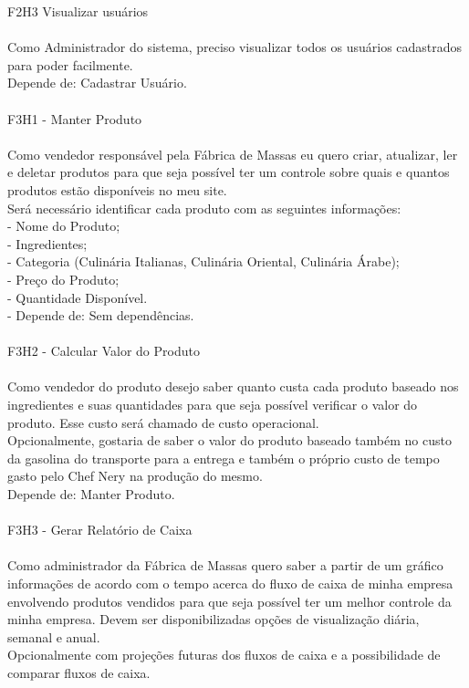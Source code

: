 \tab F2H3 Visualizar usuários\\
\\
\tab Como Administrador do sistema, preciso visualizar todos os usuários cadastrados para poder facilmente.\\
\tab Depende de: Cadastrar Usuário.\\
\\
\tab F3H1 - Manter Produto\\
\\
\tab Como vendedor responsável pela Fábrica de Massas eu quero criar, atualizar, ler e deletar produtos para que seja possível ter um controle sobre quais e quantos produtos estão disponíveis no meu site.\\
\tab Será necessário identificar cada produto com as seguintes informações:\\
\tab - Nome do Produto;\\
\tab - Ingredientes;\\
\tab - Categoria (Culinária Italianas, Culinária Oriental, Culinária Árabe);\\
\tab - Preço do Produto;\\
\tab - Quantidade Disponível.\\
\tab - Depende de: Sem dependências.\\
\\
\tab F3H2 - Calcular Valor do Produto\\
\\
\tab Como vendedor do produto desejo saber quanto custa cada produto baseado nos ingredientes e suas quantidades para que seja possível verificar o valor do produto. Esse custo será chamado de custo operacional.\\
\tab Opcionalmente, gostaria de saber o valor do produto baseado também no custo da gasolina do transporte para a entrega e também o próprio custo de tempo gasto pelo Chef Nery na produção do mesmo.\\
\tab Depende de: Manter Produto.\\
\\
\tab F3H3 - Gerar Relatório de Caixa\\
\\
\tab Como administrador da Fábrica de Massas quero saber a partir de um gráfico informações de acordo com o tempo acerca do fluxo de caixa de minha empresa envolvendo produtos vendidos para que seja possível ter um melhor controle da minha empresa. Devem ser disponibilizadas opções de visualização diária, semanal e anual.\\
\tab Opcionalmente com projeções futuras dos fluxos de caixa e a possibilidade de comparar fluxos de caixa.\\
